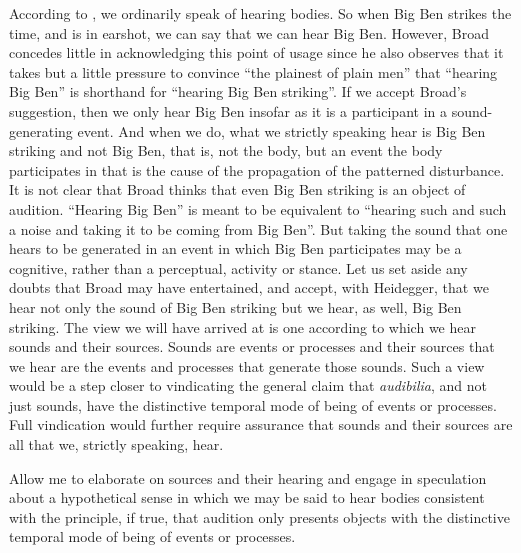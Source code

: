 According to \citet[4]{Broad:1952kx}, we ordinarily speak of hearing bodies. So when Big Ben strikes the time, and is in earshot, we can say that we can hear Big Ben. However, Broad concedes little in acknowledging this point of usage since he also observes that it takes but a little pressure to convince ``the plainest of plain men'' that ``hearing Big Ben'' is shorthand for ``hearing Big Ben striking''. If we accept Broad's suggestion, then we only hear Big Ben insofar as it is a participant in a sound-generating event. And when we do, what we strictly speaking hear is Big Ben striking and not Big Ben, that is, not the body, but an event the body participates in that is the cause of the propagation of the patterned disturbance. It is not clear that Broad thinks that even Big Ben striking is an object of audition. ``Hearing Big Ben'' is meant to be equivalent to ``hearing such and such a noise and taking it to be coming from Big Ben''. But taking the sound that one hears to be generated in an event in which Big Ben participates may be a cognitive, rather than a perceptual, activity or stance. Let us set aside any doubts that Broad may have entertained, and accept, with Heidegger, that we hear not only the sound of Big Ben striking but we hear, as well, Big Ben striking. The view we will have arrived at is one according to which we hear sounds and their sources. Sounds are events or processes and their sources that we hear are the events and processes that generate those sounds. Such a view would be a step closer to vindicating the general claim that \emph{audibilia}, and not just sounds, have the distinctive temporal mode of being of events or processes. Full vindication would further require assurance that sounds and their sources are all that we, strictly speaking, hear.

Allow me to elaborate on sources and their hearing and engage in speculation about a hypothetical sense in which we may be said to hear bodies consistent with the principle, if true, that audition only presents objects with the distinctive temporal mode of being of events or processes.

